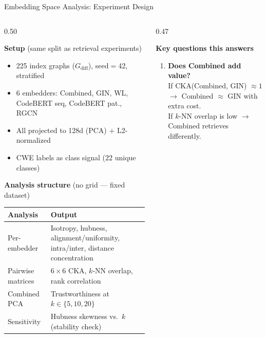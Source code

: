 \documentclass[aspectratio=169,10pt]{beamer}
\begin{document}
\begin{frame}{Embedding Space Analysis: Experiment Design}
\begin{columns}[T]
\begin{column}{0.50\textwidth}

  \textbf{Setup} {\small(same split as retrieval experiments)}

  \vspace{0.3em}
  {\scriptsize
  \begin{itemize}\setlength{\itemsep}{3pt}
    \item 225 index graphs ($G_{\text{diff}}$), seed$=$42, stratified
    \item 6 embedders: Combined, GIN, WL, CodeBERT seq, CodeBERT pat., RGCN
    \item All projected to 128d (PCA) $+$ L2-normalized
    \item CWE labels as class signal (22 unique classes)
  \end{itemize}}

  \vspace{0.5em}
  \textbf{Analysis structure} {\small(no grid — fixed dataset)}

  \vspace{0.3em}
  {\scriptsize
  \renewcommand{\arraystretch}{1.25}
  \begin{tabular}{p{2.2cm}p{4.8cm}}
    \toprule
    \textbf{Analysis} & \textbf{Output} \\
    \midrule
    Per-embedder
      & Isotropy, hubness, alignment/uniformity, intra/inter,
        distance concentration \\
    Pairwise matrices
      & $6 \times 6$ CKA, $k$-NN overlap, rank correlation \\
    Combined PCA
      & Trustworthiness at $k \in \{5, 10, 20\}$ \\
    Sensitivity
      & Hubness skewness vs.\ $k$ (stability check) \\
    \bottomrule
  \end{tabular}}

\end{column}
\begin{column}{0.47\textwidth}

  \textbf{Key questions this answers}

  \vspace{0.3em}
  {\scriptsize
  \begin{enumerate}\setlength{\itemsep}{4pt}
    \item \textbf{Does Combined add value?}\\
      If CKA(Combined, GIN) $\approx 1$ $\to$ Combined $\approx$ GIN with extra cost.\\
      If $k$-NN overlap is low $\to$ Combined retrieves differently.


\end{enumerate}}
\end{column}
\end{columns}
\end{frame}
\end{document}
